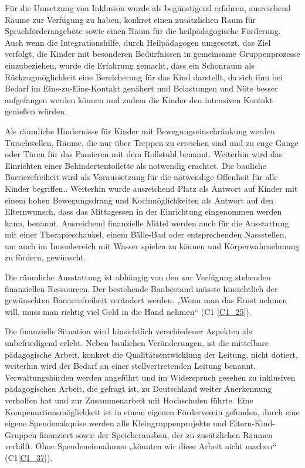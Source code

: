 Für die Umsetzung von Inklusion wurde als begünstigend erfahren, ausreichend Räume zur Verfügung zu haben, konkret einen zusätzlichen Raum für Sprachförderangebote sowie einen Raum für die heilpädagogische Förderung. Auch wenn die Integrationshilfe, durch Heilpädagogen umgesetzt, das Ziel verfolgt, die Kinder mit besonderen Bedürfnissen in gemeinsame Gruppenprozesse einzubeziehen, wurde die Erfahrung gemacht, dass ein Schonraum als Rückzugmöglichkeit eine Bereicherung für das Kind darstellt, da sich ihm bei Bedarf im Eins-zu-Eins-Kontakt genähert und Belastungen und Nöte besser aufgefangen werden können und zudem die Kinder den intensiven Kontakt genießen würden. 

Als räumliche Hindernisse für Kinder mit Bewegungseinschränkung werden Türschwellen, Räume, die nur über Treppen zu erreichen sind und zu enge Gänge oder Türen für das Passieren mit dem Rollstuhl benannt. Weiterhin wird das Einrichten einer Behindertentoilette als notwendig erachtet.
Die bauliche Barrierefreiheit wird als Voraussetzung für die notwendige Offenheit für alle Kinder begriffen.. Weiterhin wurde ausreichend Platz als Antwort auf Kinder mit einem hohen Bewegungsdrang und Kochmöglichkeiten als Antwort auf den Elternwunsch, dass das Mittagessen in der Einrichtung eingenommen werden kann, benannt. Ausreichend finanzielle Mittel werden auch für die Ausstattung mit einer Therapieschaukel, einem Bälle-Bad oder entsprechenden Nassstellen, um auch im Innenbereich mit Wasser spielen zu können und Körperwahrnehmung zu fördern, gewünscht.

Die räumliche Ausstattung ist abhängig von den zur Verfügung stehenden finanziellen Ressourcen. Der bestehende Baubestand müsste hinsichtlich der gewünschten Barrierefreiheit verändert werden. „Wenn man das Ernst nehmen will, muss man richtig viel Geld in die Hand nehmen“ (C1 \ref{C1_25}).

Die finanzielle Situation wird hinsichtlich verschiedener Aspekten als unbefriedigend erlebt. 
Neben baulichen Veränderungen, ist die mittelbare pädagogische Arbeit, konkret die Qualitätsentwicklung der Leitung, nicht dotiert, weiterhin wird der Bedarf an einer stellvertretenden Leitung benannt. Verwaltungshürden werden angeführt und im Widerspruch gesehen zu inklusiven pädagogischen Arbeit, die gefragt ist, zu Deutschland weiter Anerkennung verholfen hat und zur Zusammenarbeit mit Hochschulen führte. Eine Kompensationsmöglichkeit ist in einem eigenen Förderverein gefunden, durch eine eigene Spendenakquise werden alle Kleingruppenprojekte und Eltern-Kind-Gruppen finanziert sowie der Speicherausbau, der zu zusätzlichen Räumen verhilft. Ohne Spendeneinnahmen „könnten wir diese Arbeit nicht machen“ (C1\ref{C1_37}).


     
 

